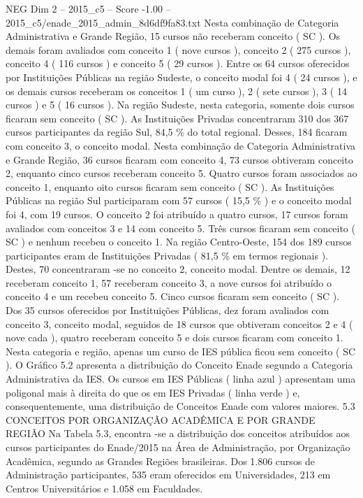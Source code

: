 \begin{textsample}{NEG Dim 2 – 2015\_c5 – Score -1.00 – 2015\_c5/enade\_2015\_admin\_8d6df9fa83.txt}
Nesta combinação de Categoria Administrativa e Grande Região, 15 cursos não receberam conceito ( SC ).
Os demais foram avaliados com conceito 1 ( nove cursos ), conceito 2 ( 275 cursos ), conceito 4 ( 116 cursos ) e conceito 5 ( 29 cursos ).
Entre os 64 cursos oferecidos por Instituições Públicas na região Sudeste, o conceito modal foi 4 ( 24 cursos ), e os demais cursos receberam os conceitos 1 ( um curso ), 2 ( sete cursos ), 3 ( 14 cursos ) e 5 ( 16 cursos ).
Na região Sudeste, nesta categoria, somente dois cursos ficaram sem conceito ( SC ).
As Instituições Privadas concentraram 310 dos 367 cursos participantes da região Sul, 84,5 \% do total regional.
Desses, 184 ficaram com conceito 3, o conceito modal.
Nesta combinação de Categoria Administrativa e Grande Região, 36 cursos ficaram com conceito 4, 73 cursos obtiveram conceito 2, enquanto cinco cursos receberam conceito 5.
Quatro cursos foram associados ao conceito 1, enquanto oito cursos ficaram sem conceito ( SC ).
As Instituições Públicas na região Sul participaram com 57 cursos ( 15,5 \% ) e o conceito modal foi 4, com 19 cursos.
O conceito 2 foi atribuído a quatro cursos, 17 cursos foram avaliados com conceitos 3 e 14 com conceito 5.
Três cursos ficaram sem conceito ( SC ) e nenhum recebeu o conceito 1.
Na região Centro-Oeste, 154 dos 189 cursos participantes eram de Instituições Privadas ( 81,5 \% em termos regionais ).
Destes, 70 concentraram -se no conceito 2, conceito modal.
Dentre os demais, 12 receberam conceito 1, 57 receberam conceito 3, a nove cursos foi atribuído o conceito 4 e um recebeu conceito 5.
Cinco cursos ficaram sem conceito ( SC ).
Dos 35 cursos oferecidos por Instituições Públicas, dez foram avaliados com conceito 3, conceito modal, seguidos de 18 cursos que obtiveram conceitos 2 e 4 ( nove cada ), quatro receberam conceito 5 e dois cursos ficaram com conceito 1.
Nesta categoria e região, apenas um curso de IES pública ficou sem conceito ( SC ).
O Gráfico 5.2 apresenta a distribuição do Conceito Enade segundo a Categoria Administrativa da IES.
Os cursos em IES Públicas ( linha azul ) apresentam uma poligonal mais à direita do que os em IES Privadas ( linha verde ) e, consequentemente, uma distribuição de Conceitos Enade com valores maiores. 5.3 CONCEITOS POR ORGANIZAÇÃO ACADÊMICA E POR GRANDE REGIÃO Na Tabela 5.3, encontra -se a distribuição dos conceitos atribuídos aos cursos participantes do Enade/2015 na Área de Administração, por Organização Acadêmica, segundo as Grandes Regiões brasileiras.
Dos 1.806 cursos de Administração participantes, 535 eram oferecidos em Universidades, 213 em Centros Universitários e 1.058 em Faculdades.

\end{textsample}
